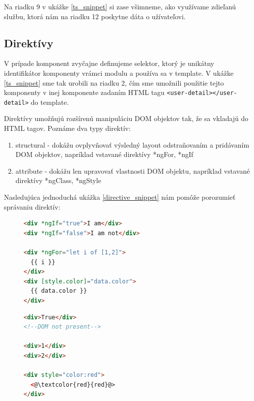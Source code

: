 \documentclass[
  digital, %
  twoside, %
  notable,   %
  nolof,   %
  nolot,   %
]{fithesis3}
\begin{document}
Na riadku 9 v ukážke \ref{ts_snippet} si zase všimneme, ako využívame zdieľanú službu, ktorá nám na riadku 12 poskytne dáta o užívateľovi.

\subsection{Direktívy}
V prípade komponent zvyčajne definujeme selektor, ktorý je unikátny identifikátor komponenty vrámci modulu a používa sa v template. V ukážke \ref{ts_snippet} sme tak urobili na riadku 2, čím sme umožnili použitie tejto komponenty v inej komponente zadaním HTML tagu \texttt{<user-detail></user-detail>} do template.

Direktívy umožňujú rozšírenú manipuláciu DOM objektov tak, že sa vkladajú do HTML tagov. Poznáme dva typy direktív\cite{angular}:
\begin{enumerate}
\item structural - dokážu ovplyvňovať výsledný layout odstraňovaním a pridávaním DOM objektov, napríklad vstavané direktívy *ngFor, *ngIf
\item attribute - dokážu len upravovať vlastnosti DOM objektu, napríklad vstavané direktívy *ngClass, *ngStyle
\end{enumerate}

Nasledujúca jednoduchá ukážka \ref{directive_snippet} nám pomôže porozumieť správaniu direktív:
\begin{figure}[H]
 \centering
 \begin{minipage}{.59\textwidth}

  \centering
  \begin{lstlisting}[language=HTML,caption={Direktívy použité v template (vľavo) a ako ich vo výsledku vníma prehliadač (vpravo)},label=directive_snippet]
<div *ngIf="true">I am</div>
<div *ngIf="false">I am not</div>

<div *ngFor="let i of [1,2]">
  {{ i }}
</div>
<div [style.color]="data.color">
  {{ data.color }}
</div>
  \end{lstlisting}

 \end{minipage}
 \begin{minipage}{.39\textwidth}

  \centering
  \begin{lstlisting}[language=HTML,numbers=none,xleftmargin=0em]
<div>True</div>
<!--DOM not present-->

<div>1</div>
<div>2</div>

<div style="color:red">
  <@\textcolor{red}{red}@>
</div>
  \end{lstlisting}
 
 \end{minipage}
\end{figure}
\end{document}
